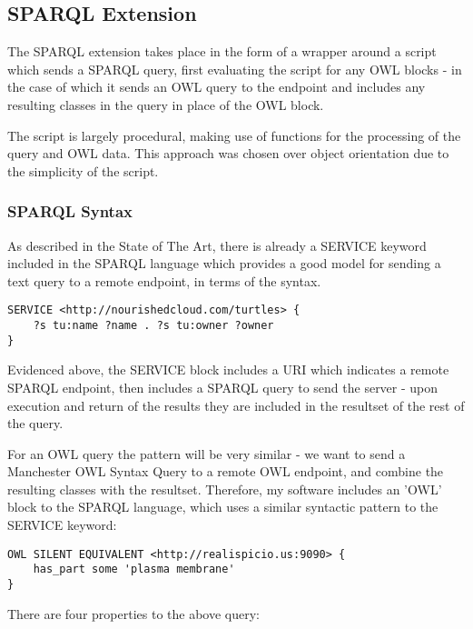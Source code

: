 \documentclass{article}
\begin{document}
\subsection{SPARQL Extension}

The SPARQL extension takes place in the form of a wrapper around a script which
sends a SPARQL query, first evaluating the script for any OWL blocks - in the
case of which it sends an OWL query to the endpoint and includes any resulting
classes in the query in place of the OWL block.

The script is largely procedural, making use of functions for the processing of
the query and OWL data. This approach was chosen over object orientation due to
the simplicity of the script.

\subsubsection{SPARQL Syntax}

As described in the State of The Art, there is already a SERVICE keyword
included in the SPARQL language which provides a good model for sending a text
query to a remote endpoint, in terms of the syntax.\cite{sservice} 

\begin{lstlisting}
SERVICE <http://nourishedcloud.com/turtles> { 
    ?s tu:name ?name . ?s tu:owner ?owner
}
\end{lstlisting}

Evidenced above, the SERVICE block includes a URI which indicates a remote
SPARQL endpoint, then includes a SPARQL query to send the server - upon
execution and return of the results they are included in the resultset of the
rest of the query.

For an OWL query the pattern will be very similar - we want to send a Manchester
OWL Syntax Query to a remote OWL endpoint, and combine the resulting classes
with the resultset. Therefore, my software includes an 'OWL' block to the SPARQL 
language, which uses a similar syntactic pattern to the SERVICE keyword:

\begin{lstlisting}
OWL SILENT EQUIVALENT <http://realispicio.us:9090> {
    has_part some 'plasma membrane'
}
\end{lstlisting}

There are four properties to the above query:
\end{document}
